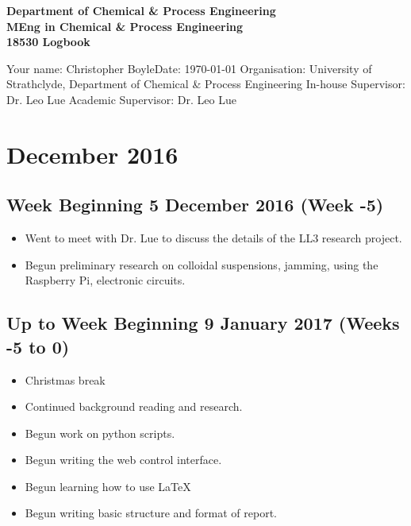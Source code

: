 \documentclass[a4]{report}
\def\atitle{Logbook}
\def\myname{Christopher Boyle}
\begin{document}
	\begin{titlepage}
		\centering
		\vskip4cm
		{
			\bfseries\Large
			Department of Chemical \& Process Engineering\\
			\vskip1cm
			MEng in Chemical \& Process Engineering\\
			18530
			\vskip3cm
			\LARGE\atitle
		}
		\vskip3cm
		\begin{flushleft}
			\vskip3cm
			Your name: \myname \hfill Date: \today
			\vskip1cm
			Organisation: University of Strathclyde, Department of Chemical \& Process Engineering\newline%
			In-house Supervisor: Dr. Leo Lue \newline%
			Academic Supervisor:  Dr. Leo Lue
		\end{flushleft}
	\end{titlepage}
	
	\tableofcontents
	
	\chapter{December 2016}
	\section{Week Beginning 5 December 2016 (Week -5)}
	\begin{itemize}
		\item Went to meet with Dr. Lue to discuss the details of the LL3 research project. 
		\item Begun preliminary research on colloidal suspensions, jamming, using the Raspberry Pi, electronic circuits.
	\end{itemize}
	\section{Up to Week Beginning 9 January 2017 (Weeks -5 to 0)}
	\begin{itemize}
		\item Christmas break
		\item Continued background reading and research. 
		\item Begun work on python scripts.
		\item Begun writing the web control interface.
		\item Begun learning how to use \LaTeX
		\item Begun writing basic structure and format of report.
	\end{itemize}
\end{document}
